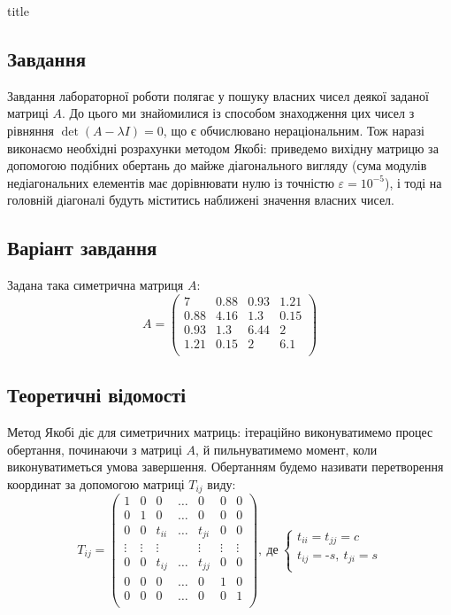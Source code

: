 \documentclass[a4paper,14pt]{extarticle} %
\begin{document}
{title}

\newpage

\subsection*{Завдання}

Завдання лабораторної роботи полягає у пошуку власних чисел деякої заданої матриці $A$. До цього ми 
знайомилися із способом знаходження цих чисел з рівняння $\det(A-\lambda I)=0$, що є обчислювано нераціональним. 
Тож наразі виконаємо необхідні розрахунки методом Якобі: приведемо вихідну матрицю за допомогою подібних 
обертань до майже діагонального вигляду (сума модулів недіагональних елементів має дорівнювати нулю із точністю 
$\varepsilon=10^{-5}$), і тоді на головній діагоналі будуть міститись наближені значення власних чисел.

\subsection*{Варіант завдання}

Задана така симетрична матриця $A:$
\[
A=
    \begin{pmatrix}
        7 & 0.88 & 0.93 & 1.21 \\
        0.88 & 4.16 & 1.3 & 0.15 \\
        0.93 & 1.3 & 6.44 & 2 \\
        1.21 & 0.15 & 2 & 6.1 \\
    \end{pmatrix}
\]

\subsection*{Теоретичні відомості}

Метод Якобі діє для симетричних матриць: ітераційно виконуватимемо процес обертання, починаючи з матриці $A$, й
пильнуватимемо момент, коли виконуватиметься умова завершення. Обертанням будемо називати перетворення координат за допомогою матриці 
$T_{ij}$ виду:
\[
T_{ij}=
    \begin{pmatrix}
        1 & 0 & 0 & \ldots & 0 & 0 & 0\\
        0 & 1 & 0 & \ldots & 0 & 0 & 0\\
        0 & 0 & t_{ii} & \ldots & t_{ji} & 0 & 0 \\
        \vdots & \vdots & \vdots & & \vdots & \vdots & \vdots \\
        0 & 0 & t_{ij} & \ldots & t_{jj} & 0 & 0 \\
        0 & 0 & 0 & \ldots & 0 & 1 & 0 \\
        0 & 0 & 0 & \ldots & 0 & 0 & 1 \\
    \end{pmatrix},\ \text{де} \
    \begin{cases}
        t_{ii} = t_{jj} = c \\
        t_{ij} = \text{-}s,\ t_{ji} = s \\
    \end{cases}
\]
\end{document}
